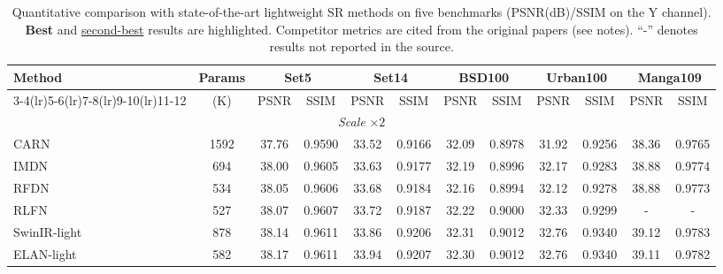 \begin{table}[t]
\centering
\caption{Quantitative comparison with state-of-the-art lightweight SR methods on five benchmarks
(PSNR(dB)/SSIM on the Y channel). \textbf{Best} and \underline{second-best} results are highlighted.
Competitor metrics are cited from the original papers (see notes). ``-'' denotes results not reported
in the source.}
\label{tab:main_comparison}
\begingroup
\scriptsize
\setlength{\tabcolsep}{2.2pt}
\renewcommand{\arraystretch}{1.05}
\begin{tabular*}{\textwidth}{@{\extracolsep{\fill}}lccccccccccc}
\toprule
\multirow{2}{*}{Method} & \multirow{2}{*}{Params} &
\multicolumn{2}{c}{Set5} & \multicolumn{2}{c}{Set14} & \multicolumn{2}{c}{BSD100} &
\multicolumn{2}{c}{Urban100} & \multicolumn{2}{c}{Manga109} \\
\cmidrule(lr){3-4}\cmidrule(lr){5-6}\cmidrule(lr){7-8}\cmidrule(lr){9-10}\cmidrule(lr){11-12}
 & (K) & PSNR & SSIM & PSNR & SSIM & PSNR & SSIM & PSNR & SSIM & PSNR & SSIM \\
\midrule
\multicolumn{12}{c}{\textit{Scale} $\times 2$} \\
\midrule
CARN            & 1592 & 37.76 & 0.9590 & 33.52 & 0.9166 & 32.09 & 0.8978 & 31.92 & 0.9256 & 38.36 & 0.9765 \\
IMDN            & 694  & 38.00 & 0.9605 & 33.63 & 0.9177 & 32.19 & 0.8996 & 32.17 & 0.9283 & 38.88 & 0.9774 \\
RFDN            & 534  & 38.05 & 0.9606 & 33.68 & 0.9184 & 32.16 & 0.8994 & 32.12 & 0.9278 & 38.88 & 0.9773 \\
RLFN            & 527  & 38.07 & 0.9607 & 33.72 & 0.9187 & 32.22 & 0.9000 & 32.33 & 0.9299 & -     & -      \\
SwinIR-light    & 878  & 38.14 & 0.9611 & 33.86 & 0.9206 & 32.31 & 0.9012 & 32.76 & 0.9340 & 39.12 & 0.9783 \\
ELAN-light      & 582  & 38.17 & 0.9611 & 33.94 & 0.9207 & 32.30 & 0.9012 & 32.76 & 0.9340 & 39.11 & 0.9782 \\

\end{tabular*}
\end{table}

